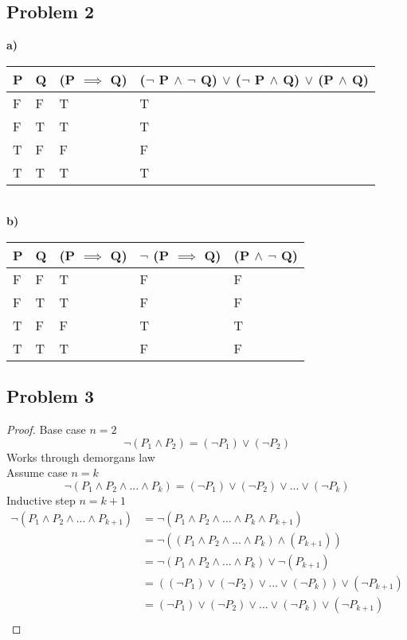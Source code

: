 \documentclass[12pt]{article}
\begin{document}
\subsection*{Problem 2}
\textbf{a)}
\begin{table}[!h]
\begin{tabular}{|l|l|l|l|}
\hline
P & Q & (P $\implies$ Q) & ($\lnot$ P $\land$ $\lnot$ Q) $\lor$ ($\lnot$ P $\land$ Q) $\lor$ (P $\land$ Q) \\ \hline
F & F & T & T \\ \hline
F & T & T & T \\ \hline
T & F & F & F \\ \hline
T & T & T & T \\ \hline
\end{tabular}
\end{table} \\
\textbf{b)}
\begin{table}[!h]
\begin{tabular}{|l|l|l|l|l|}
\hline
P & Q & (P $\implies$ Q) & $\lnot$ (P $\implies$ Q) & (P $\land$ $\lnot$ Q) \\ \hline
F & F & T & F & F \\ \hline
F & T & T & F & F \\ \hline
T & F & F & T & T \\ \hline
T & T & T & F & F \\ \hline
\end{tabular}
\end{table}
\newpage
\subsection*{Problem 3}
\begin{proof}
Base case $n = 2$
\[ \lnot(P_1 \land P_2) = (\lnot P_1) \lor (\lnot P_2) \]
Works through demorgans law\\
Assume case $n = k$
\[ \lnot(P_1 \land P_2 \land ... \land P_k) = (\lnot P_1) \lor (\lnot P_2) \lor ... \lor (\lnot P_k) \]
Inductive step $n = k + 1$
\begin{align*}
\lnot(P_1 \land P_2 \land ... \land P_{k+1}) &= \lnot(P_1 \land P_2 \land ... \land P_k \land P_{k+1})\\
&= \lnot((P_1 \land P_2 \land ... \land P_k) \land (P_{k+1})) \\
&= \lnot(P_1 \land P_2 \land ... \land P_k) \lor \lnot (P_{k+1}) \\
&= ((\lnot P_1) \lor (\lnot P_2) \lor ... \lor (\lnot P_k)) \lor (\lnot P_{k+1}) \\
&= (\lnot P_1) \lor (\lnot P_2) \lor ... \lor (\lnot P_k) \lor (\lnot P_{k+1}) \\
\end{align*}
\end{proof}
\end{document}

